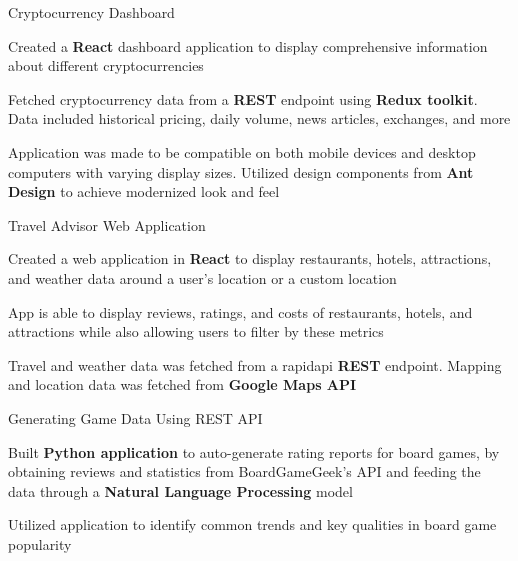 

\begin{cventries}

    \cvprojects
    {}
    {Cryptocurrency Dashboard}
    {}
    {} %
    {
        \begin{cvitems}
            \item{Created a \textbf{React} dashboard application to display comprehensive information about different cryptocurrencies}
            \item{Fetched cryptocurrency data from a \textbf{REST} endpoint using \textbf{Redux toolkit}. Data included historical pricing, daily volume, news articles, exchanges, and more}
            \item{Application was made to be compatible on both mobile devices and desktop computers with varying display sizes. Utilized design components from \textbf{Ant Design} to achieve modernized look and feel}
        \end{cvitems}
    }
    
    \cvprojects
    {}
    {Travel Advisor Web Application}
    {}
    {} %
    {
        \begin{cvitems}
            \item{Created a web application in \textbf{React} to display restaurants, hotels, attractions, and weather data around a user's location or a custom location}
            \item{App is able to display reviews, ratings, and costs of restaurants, hotels, and attractions while also allowing users to filter by these metrics}
            \item{Travel and weather data was fetched from a rapidapi \textbf{
            REST} endpoint. Mapping and location data was fetched from \textbf{Google Maps API}}
        \end{cvitems}
    }
    

    \cvprojects
        {}
        {Generating Game Data Using REST API}
        {}
        {} %
        {
            \begin{cvitems}
                \item {Built \textbf{Python application} to auto-generate rating reports for board games, by obtaining reviews and statistics from BoardGameGeek's API and feeding the data through a \textbf{Natural Language Processing} model}
                \item {Utilized application to identify common trends and key qualities in board game popularity}
            \end{cvitems}
        }


\end{cventries}
